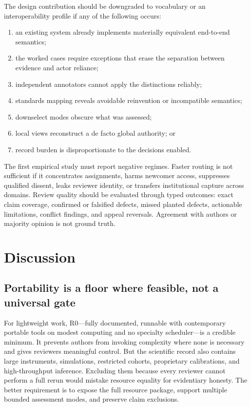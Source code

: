 \documentclass[11pt]{article}
\newcommand{\Rzero}{R0}
\begin{document}

The design contribution should be downgraded to vocabulary or an interoperability profile if any of the following occurs:

\begin{enumerate}
  \item an existing system already implements materially equivalent end-to-end semantics;
  \item the worked cases require exceptions that erase the separation between evidence and actor reliance;
  \item independent annotators cannot apply the distinctions reliably;
  \item standards mapping reveals avoidable reinvention or incompatible semantics;
  \item downselect modes obscure what was assessed;
  \item local views reconstruct a de facto global authority; or
  \item record burden is disproportionate to the decisions enabled.
\end{enumerate}

The first empirical study must report negative regimes. Faster routing is not sufficient if it concentrates assignments, harms newcomer access, suppresses qualified dissent, leaks reviewer identity, or transfers institutional capture across domains. Review quality should be evaluated through typed outcomes: exact claim coverage, confirmed or falsified defects, missed planted defects, actionable limitations, conflict findings, and appeal reversals. Agreement with authors or majority opinion is not ground truth.

\section{Discussion}
\label{sec:discussion}

\subsection{Portability is a floor where feasible, not a universal gate}

For lightweight work, \Rzero---fully documented, runnable with contemporary portable tools on modest computing and no specialty scheduler---is a credible minimum. It prevents authors from invoking complexity where none is necessary and gives reviewers meaningful control. But the scientific record also contains large instruments, simulations, restricted cohorts, proprietary calibrations, and high-throughput inference. Excluding them because every reviewer cannot perform a full rerun would mistake resource equality for evidentiary honesty. The better requirement is to expose the full resource package, support multiple bounded assessment modes, and preserve claim exclusions.
\end{document}
